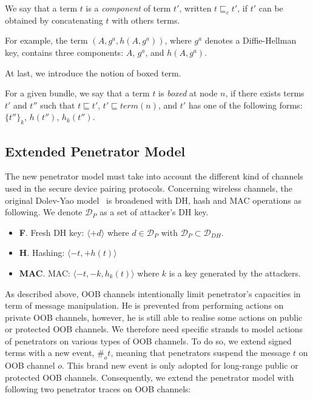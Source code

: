 \begin{Definition}[Component]
We say that a term $t$ is a \emph{component} of term $t'$, written $t \sqsubseteq_c t'$, if $t'$ can be obtained by concatenating $t$ with others terms.
\end{Definition}

For example, the term $(A,g^a,h(A,g^a))$, where $g^a$ denotes a Diffie-Hellman key, contains three components: $A$, $g^a$, and $h(A,g^a)$.

At last, we introduce the notion of boxed term.

\begin{Definition} 
For a given bundle, we say that a term $t$ is \emph{boxed} at node $n$, if there exists terms $t'$ and $t''$ such that $t \sqsubseteq t'$, $t' \sqsubseteq term(n)$, and $t'$ has one of the following forms: ${\{t''\}}_k$, $h(t'')$, $h_k(t'')$.
\end{Definition}

\subsection{Extended Penetrator Model}\label{penetrator_model}

The new penetrator model must take into account the different kind of channels used in the secure device pairing protocols. Concerning wireless channels, the original Dolev-Yao model~\cite{dolev-yao} is broadened with DH, hash and MAC operations as following. We denote $\mathcal{D}_P$ as a set of attacker's DH key. 

\begin{itemize}
\item \textbf{F}. Fresh DH key: $\langle +d \rangle  $  where $d \in \mathcal{D}_P$ with $\mathcal{D}_P \subset \mathcal{D}_{DH}$.
\item \textbf{H}. Hashing: $\langle -t,+h(t)   \rangle$  
\item \textbf{MAC}. MAC: $\langle -t,-k, h_k(t)   \rangle$ where $k$ is a key generated by the attackers. 
\end{itemize} 

As described above, OOB channels intentionally limit penetrator's capacities in term of message manipulation. He is prevented from performing actions on private OOB channels, however, he is still able to realise some actions on public or protected OOB channels. We therefore need specific strands to model actions of penetrators on various types of OOB channels. To do so, we extend signed terms with a new event, $\#_ot$, meaning that penetrators suspend the message $t$ on OOB channel $o$. This brand new event is only adopted for long-range public or protected OOB channels. Consequently, we extend the penetrator model with following two penetrator traces on OOB channels:

